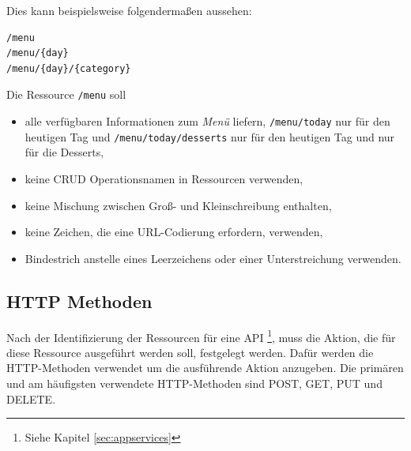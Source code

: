 Dies kann beispielsweise folgendermaßen aussehen:

\begin{lstlisting}[caption={Subressourcen Aufbau}]
/menu
/menu/{day}
/menu/{day}/{category}
\end{lstlisting}

Die Ressource \lstinline[columns=fixed]{/menu} soll %

\begin{itemize}

\item  alle verfügbaren Informationen zum \textit{Menü} liefern, 
\lstinline[columns=fixed]{/menu/today} nur für den heutigen Tag und \lstinline[columns=fixed]{/menu/today/desserts} nur für den heutigen Tag und nur für die Desserts,
\item keine \ac{CRUD} Operationsnamen in Ressourcen verwenden,
\item keine Mischung zwischen Groß- und Kleinschreibung enthalten,
\item keine Zeichen, die eine URL-Codierung erfordern, verwenden, 
\item Bindestrich anstelle eines Leerzeichens oder einer Unterstreichung verwenden.
\end{itemize}

\subsection{HTTP Methoden}
Nach der Identifizierung der Ressourcen für eine \ac{API} \footnote{Siehe Kapitel \ref{sec:appservices}}, muss die Aktion, die für diese Ressource ausgeführt werden soll, festgelegt werden. Dafür werden die HTTP-Methoden verwendet um die ausführende Aktion anzugeben. Die primären und am häufigsten verwendete HTTP-Methoden sind POST, GET, PUT und DELETE. 

